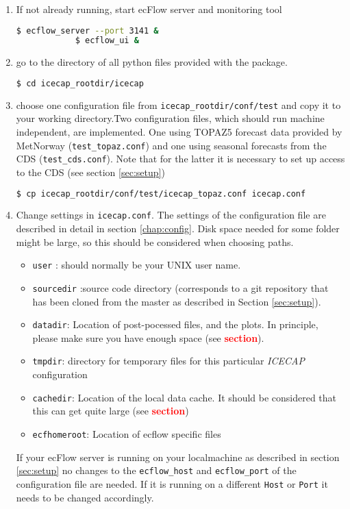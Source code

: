 \documentclass[DIV=10, parskip=full]{scrreprt}
\newcommand{\ice}{\textit{ICECAP}\xspace}
\newcommand{\tbd}[1]{\textcolor{red}{\textbf{#1}}}
\begin{document}
\begin{enumerate}
	\item If not already running, start ecFlow server and monitoring tool 
		\begin{lstlisting}[language=bash]
			$ ecflow_server --port 3141 &
			$ ecflow_ui & 
		\end{lstlisting}

		
	\item go to the directory of all python files provided with the package.
	\begin{lstlisting}[language=bash]
		$ cd icecap_rootdir/icecap
	\end{lstlisting}
	
	\item choose one configuration file from \texttt{icecap\_rootdir/conf/test} and copy it to your working directory.Two configuration files, which should run machine independent, are implemented. One using TOPAZ5 forecast data provided by MetNorway (\texttt{test\_topaz.conf}) and one using seasonal forecasts from the CDS (\texttt{test\_cds.conf}). Note that for the latter it is necessary to set up access to the CDS (see section \ref{sec:setup})\\
	\begin{lstlisting}[language=bash]
		$ cp icecap_rootdir/conf/test/icecap_topaz.conf icecap.conf
	\end{lstlisting}
	
	\item Change settings in \texttt{icecap.conf}. The settings of the configuration file are described in detail in section \ref{chap:config}. Disk space needed for some folder might be large, so this should be considered when choosing paths.  
	\begin{itemize}
		\item \texttt{user} : should normally be your UNIX user name. 
		\item \texttt{sourcedir} :source code directory (corresponds to a git repository that has been cloned from the master as described in Section \ref{sec:setup}).
		\item \texttt{datadir}: Location of post-pocessed files, and the plots. In principle, please make sure you have enough space (see \tbd{section}). 
		\item \texttt{tmpdir}: directory for temporary files for this particular \ice configuration
		\item \texttt{cachedir}: Location of the local data cache. It should be considered that this can get quite large (see \tbd{section})
		\item \texttt{ecfhomeroot}: Location of ecflow specific files
	\end{itemize}
	If your ecFlow server is running on your localmachine as described in section \ref{sec:setup} no changes to the \texttt{ecflow\_host} and  \texttt{ecflow\_port} of the configuration file are needed. If it is running on a different \texttt{Host} or \texttt{Port} it needs to be changed accordingly.
	

\end{enumerate}
\end{document}
